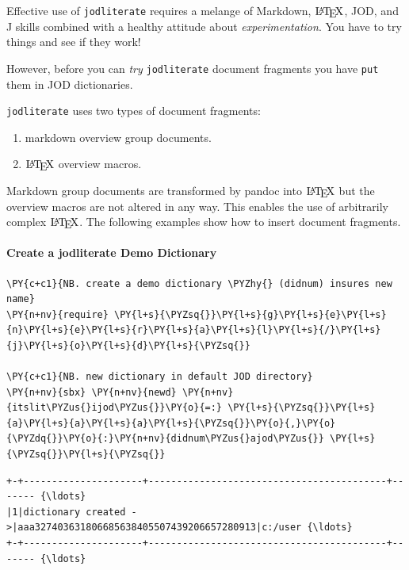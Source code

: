 Effective use of \texttt{jodliterate} requires a melange of Markdown,
\(\LaTeX\), JOD, and J skills combined with a healthy attitude about
\emph{experimentation}. You have to try things and see if they work!

However, before you can \emph{try} \texttt{jodliterate} document
fragments you have \texttt{put} them in JOD dictionaries.

\texttt{jodliterate} uses two types of document fragments:

\begin{enumerate}
\def\labelenumi{\arabic{enumi}.}
\tightlist
\item
  markdown overview group documents.
\item
  \(\LaTeX\) overview macros.
\end{enumerate}

Markdown group documents are transformed by pandoc into \(\LaTeX\) but
the overview macros are not altered in any way. This enables the use of
arbitrarily complex \(\LaTeX\). The following examples show how to
insert document fragments.

    \hypertarget{create-a-jodliterate-demo-dictionary}{%
\paragraph{Create a jodliterate Demo
Dictionary}\label{create-a-jodliterate-demo-dictionary}}

    \begin{tcolorbox}[breakable, size=fbox, boxrule=1pt, pad at break*=1mm,colback=cellbackground, colframe=cellborder]
\begin{Verbatim}[commandchars=\\\{\}]
\PY{c+c1}{NB. create a demo dictionary \PYZhy{} (didnum) insures new name}
\PY{n+nv}{require} \PY{l+s}{\PYZsq{}}\PY{l+s}{g}\PY{l+s}{e}\PY{l+s}{n}\PY{l+s}{e}\PY{l+s}{r}\PY{l+s}{a}\PY{l+s}{l}\PY{l+s}{/}\PY{l+s}{j}\PY{l+s}{o}\PY{l+s}{d}\PY{l+s}{\PYZsq{}}

\PY{c+c1}{NB. new dictionary in default JOD directory}
\PY{n+nv}{sbx} \PY{n+nv}{newd} \PY{n+nv}{itslit\PYZus{}ijod\PYZus{}}\PY{o}{=:} \PY{l+s}{\PYZsq{}}\PY{l+s}{a}\PY{l+s}{a}\PY{l+s}{a}\PY{l+s}{\PYZsq{}}\PY{o}{,}\PY{o}{\PYZdq{}}\PY{o}{:}\PY{n+nv}{didnum\PYZus{}ajod\PYZus{}} \PY{l+s}{\PYZsq{}}\PY{l+s}{\PYZsq{}}
\end{Verbatim}
\end{tcolorbox}

    \begin{Verbatim}[commandchars=\\\{\}]
+-+---------------------+------------------------------------------+------- {\ldots}
|1|dictionary created ->|aaa327403631806685638405507439206657280913|c:/user {\ldots}
+-+---------------------+------------------------------------------+------- {\ldots}
    \end{Verbatim}

